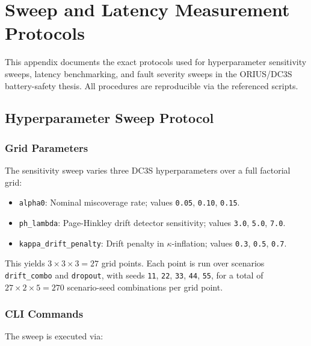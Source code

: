 \chapter{Sweep and Latency Measurement Protocols}
\label{app:sweep-latency}

This appendix documents the exact protocols used for hyperparameter sensitivity sweeps, latency benchmarking, and fault severity sweeps in the ORIUS/DC3S battery-safety thesis. All procedures are reproducible via the referenced scripts.

\section{Hyperparameter Sweep Protocol}

\subsection{Grid Parameters}

The sensitivity sweep varies three DC3S hyperparameters over a full factorial grid:

\begin{itemize}
\item \texttt{alpha0}: Nominal miscoverage rate; values \texttt{0.05}, \texttt{0.10}, \texttt{0.15}.
\item \texttt{ph\_lambda}: Page-Hinkley drift detector sensitivity; values \texttt{3.0}, \texttt{5.0}, \texttt{7.0}.
\item \texttt{kappa\_drift\_penalty}: Drift penalty in $\kappa$-inflation; values \texttt{0.3}, \texttt{0.5}, \texttt{0.7}.
\end{itemize}

This yields $3 \times 3 \times 3 = 27$ grid points. Each point is run over scenarios \texttt{drift\_combo} and \texttt{dropout}, with seeds \texttt{11}, \texttt{22}, \texttt{33}, \texttt{44}, \texttt{55}, for a total of $27 \times 2 \times 5 = 270$ scenario-seed combinations per grid point.

\subsection{CLI Commands}

The sweep is executed via:

